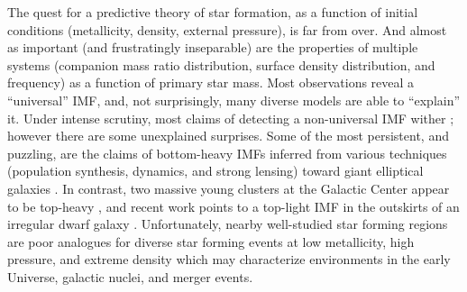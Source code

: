 \documentclass[11pt]{article}
\begin{document}
The quest for a predictive theory of star formation, as a function of initial conditions (metallicity, density, external pressure), is far from over.  
And almost as important (and frustratingly inseparable) are the properties of multiple systems (companion mass ratio distribution, surface density distribution, and frequency) as a function of primary star mass. 
Most observations reveal a “universal” IMF, and, not surprisingly, many diverse models are able to “explain” it. 
Under intense scrutiny, most claims of detecting a non-universal IMF wither \citep[c.f.][]{Bastian:2010,Luhman:2018}; however there are some unexplained surprises.  
Some of the most persistent, and puzzling, are the claims of bottom-heavy IMFs inferred from various techniques (population synthesis, dynamics, and strong lensing) toward giant elliptical galaxies \citep[e.g.][]{vanDokkum:2010}.  
In contrast, two massive young clusters at the Galactic Center appear to be top-heavy \citep{Lu:2013,Hosek:2018b}, and recent work points to a top-light IMF in the outskirts of an irregular dwarf galaxy \citep{2018MNRAS.477.5554W}. 
Unfortunately, nearby well-studied star forming regions are poor analogues for diverse star forming events at low metallicity, high pressure, and extreme density which may characterize environments in the early Universe, galactic nuclei, and merger events. 
\end{document}
